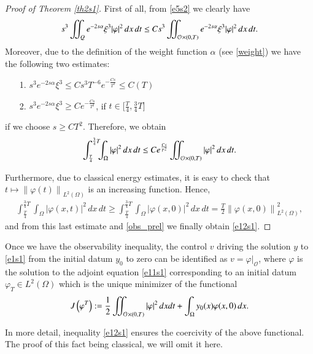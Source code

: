 \documentclass[preprint,1p]{elsarticle}
\newcommand{\norm}[2]{\left\|#1\right\|_{#2}}
\newcommand{\intd}{\displaystyle\int \kern -7pt \int}
\begin{document}
\begin{proof}[Proof of Theorem \ref{th2s1}]

First of all, from \eqref{e5s2} we clearly have
\begin{align*}
	s^3\intd_Q e^{-2s\alpha}\xi^3|\varphi|^2\,dx\,dt \leq C s^3\intd_{\mathcal O\times(0,T)} e^{-2s\alpha}\xi^3 |\varphi|^2\,dx\,dt.
\end{align*}
Moreover, due to the definition of the weight function $\alpha$ (see \eqref{weight}) we have the following two estimates:
\begin{enumerate}
	\item[1.] $s^3 e^{-2s\alpha}\xi^3 \leq Cs^3T^{-6}e^{-\frac{Cs}{T^2}}\leq C(T)$
	
	\item [2.] $s^3 e^{-2s\alpha}\xi^3 \geq Ce^{-\frac{Cs}{T^2}}$, if $t\in\Big[\frac T4,\frac 34 T\Big]$
\end{enumerate}
if we choose $s\geq CT^2$. Therefore, we obtain
\begin{align}\label{obs_prel}
	\int_{\frac T4}^{\frac 34 T}\!\!\!\int_\Omega |\varphi|^2\,dx\,dt \leq C e^{\frac {Cs}{T^2}}\intd_{\mathcal O\times(0,T)} |\varphi|^2\,dx\,dt.
\end{align}

Furthermore, due to classical energy estimates, it is easy to check that $t\mapsto \norm{\varphi(t)}{L^2(\Omega)}$ is an increasing function. Hence,
\begin{align*}
	\int_{\frac T4}^{\frac 34 T}\!\!\!\int_\Omega |\varphi(x,t)|^2\,dx\,dt \geq \int_{\frac T4}^{\frac 34 T}\!\!\!\int_\Omega |\varphi(x,0)|^2\,dx\,dt = \frac T2 \norm{\varphi(x,0)}{L^2(\Omega)}^2,
\end{align*}
and from this last estimate and \eqref{obs_prel} we finally obtain \eqref{e12s1}.
\end{proof}

Once we have the observability inequality, the control $v$ driving the solution $y$ to \eqref{e1s1} from the initial datum $y_0$ to zero can be identified as $v=\left.\varphi\right|_{\mathcal O}$, where $\varphi$ is the solution to the adjoint equation \eqref{e11s1} corresponding to an initial datum $\varphi_T\in L^2(\Omega)$ which is the unique minimizer of the functional
\begin{align}\label{functional_J}
	J\left(\varphi^T\right):= \frac 12\intd_{\mathcal O\times (0,T)} |\varphi|^2\,dxdt + \int_\Omega y_0(x)\varphi(x,0)\,dx.
\end{align}

In more detail, inequality \eqref{e12s1} ensures the coercivity of the above functional. The proof of this fact being classical, we will omit it here. 
\end{document}

